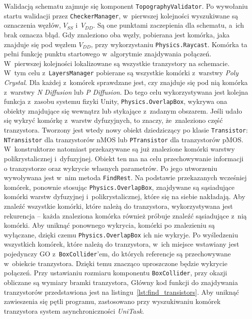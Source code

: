 Walidacją schematu zajmuje się komponent \texttt{TopographyValidator}.
Po wywołaniu startu walidacji przez \texttt{CheckerManager},
w~pierwszej kolejności wyszukiwane są oznaczenia węzłów, $V_{SS}$ i~$V_{DD}$.
Są one punktami zaczepienia dla schematu, a~ich brak oznacza błąd.
Gdy znaleziono oba węzły, pobierana jest komórka, jaka znajduje się pod węzłem $V_{DD}$,
przy wykorzystaniu \texttt{Physics.Raycast}.
Komórka ta pełni funkcję punktu startowego w~algorytmie znajdywania połączeń.\\
\indent W~pierwszej kolejności lokalizowane są wszystkie tranzystory na schemacie.
W~tym celu z~\texttt{LayersManager} pobierane są wszystkie komórki z~warstwy \textit{Poly Crystal}.
Dla każdej z~komórek sprawdzane jest, 
czy znajduje się pod nią komórka z~warstwy \textit{N Diffusion} lub \textit{P Diffusion}.
Do tego celu wykorzystywana jest kolejna funkcja z~zasobu systemu fizyki Unity, \texttt{Physics.OverlapBox},
wykrywa ona obiekty znajdujące się wewnątrz lub stykające z~zadanym obszarem.
Jeśli udało się wykryć komórkę z~warstw dyfuzyjnych, to znaczy, że~znaleziono część tranzystora.
Tworzony jest wtedy nowy obiekt dziedziczący po klasie \texttt{Transistor}:
\texttt{NTransistor} dla tranzystorów nMOS lub \texttt{PTransistor} dla tranzystorów pMOS.
W~konstruktorze natomiast przekazywane są już znalezione komórki warstwy polikrystalicznej i~dyfuzyjnej.
Obiekt ten ma na celu przechowywanie informacji o tranzystorze oraz wykrycie własnych parametrów.
Po jego utworzeniu wywoływana jest w~nim metoda \texttt{FindRest}.
Na podstawie przekazanych wcześniej komórek, ponownie stosując \texttt{Physics.OverlapBox},
znajdywane są sąsiadujące komórki warstw dyfuzyjnej i~polikrystalicznej, które się na siebie nakładają.
Aby znaleźć wszystkie komórki, które należą do tranzystora, wykorzystywana jest rekurencja
-- każda znaleziona komórka również próbuje znaleźć sąsiadujące z~nią komórki.
Aby uniknąć ponownego wykrycia, komórki po znalezieniu są wyłączane,
dzięki czemu \texttt{Physics.OverlapBox} ich nie wykryje.
Po wyśledzeniu wszystkich komórek, które należą do tranzystora,
w~ich miejsce wstawiany jest pojedynczy GO z~\texttt{BoxCollider}'em,
do których referencje są przechowywane w~obiekcie tranzystora.
Dzięki temu znacząco uproszczone będzie wykrycie połączeń.
Przy ustawianiu rozmiaru komponentu \texttt{BoxCollider}, przy okazji obliczane są wymiary bramki tranzystora,
Główny kod funkcji do znajdywania tranzystorów przedstawiona jest na listingu~\ref{lst:find_transistors}.
Aby uniknąć zawieszenia się pętli programu,
zastosowano przy wyszukiwaniu komórek tranzystora system asynchroniczności \textit{UniTask}.
\newpage

